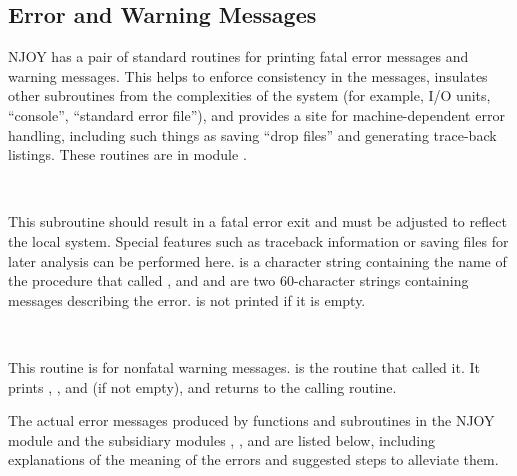 \subsection{Error and Warning Messages}
\label{ssNJOY_msg}

NJOY has a pair of standard routines for printing fatal error messages
and warning messages.  This helps to enforce consistency in the messages,
insulates other subroutines from the complexities of the system (for
example, I/O units, ``console'', ``standard error file''), and provides
a site for machine-dependent error handling, including such things as
saving ``drop files'' and generating trace-back listings. These routines
are in module .

\begin{description}
\begin{singlespace}
\item[\cword{error(from,mess1,mess2)}] ~\par
This subroutine should result in a fatal error exit and must be
adjusted to reflect the local system.  Special features such as
traceback information or saving files for later analysis can be
performed here.   is a character string containing
the name of the procedure that called , and
 and  are two 60-character strings
containing messages describing the error.   is not
printed if it is empty.

\item[\cword{mess(from,mess1,mess2)}] ~\par
This routine is for nonfatal warning messages.   is
the routine that called it.  It prints ,
, and  (if not empty), and returns to
the calling routine.
\end{singlespace}
\end{description}

\noindent
The actual error messages produced by functions and subroutines
in the NJOY module and the subsidiary modules , ,
and  are listed below, including explanations of the meaning
of the errors and suggested steps to alleviate them.

